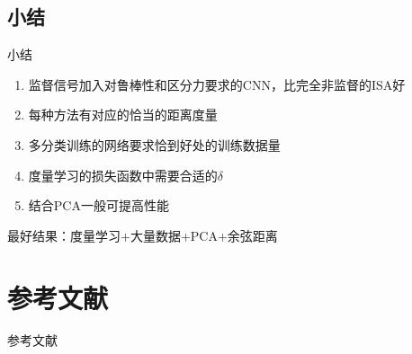 \documentclass {beamer}
\begin{document}
\subsection{小结}
\begin{frame}{小结}
    \begin{enumerate}
        \item 监督信号加入对鲁棒性和区分力要求的CNN，比完全非监督的ISA好
        \item 每种方法有对应的恰当的距离度量
        \item 多分类训练的网络要求恰到好处的训练数据量
        \item 度量学习的损失函数中需要合适的$\delta$
        \item 结合PCA一般可提高性能
    \end{enumerate}
    最好结果：度量学习+大量数据+PCA+余弦距离
\end{frame}

\section{ }
\subsection{ }

\section[]{参考文献}
\begin{frame}[allowframebreaks]{参考文献}
    \printbibliography
\end{frame}
\end{document}
